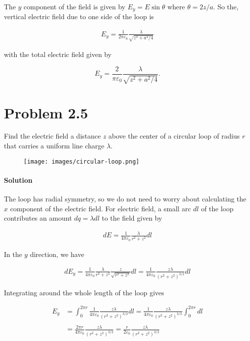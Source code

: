 \documentclass{article}
\begin{document}
The $y$ component of the field is given by $E_y = E\sin\theta$ where $\theta = 2z/a$. So the, vertical electric field due to one side of the loop is 

\begin{align*}
    E_y = \frac{1}{2\pi\varepsilon_0}{\frac{\lambda}{\sqrt{z^2  + a^2/4}}}
\end{align*}

with the total electric field given by 

$$
 E_y = \frac{2}{\pi\varepsilon_0}{\frac{\lambda}{\sqrt{z^2  + a^2/4}}}.
$$

\newpage

\section*{Problem 2.5}
Find the electric field a distance $z$ above the center of a circular loop of radius $r$ that carries a uniform line charge $\lambda$.

\begin{figure}[h]
    \centering
    \texttt{[image: images/circular-loop.png]}
\end{figure}

\paragraph{Solution} The loop has radial symmetry, so we do not need to worry about calculating the $x$ component of the electric field. For electric field, a small arc $dl$ of the loop contributes an amount $dq = \lambda dl$ to the field given by 

\begin{align*}
    dE = \frac{1}{4\pi\varepsilon_0}\frac{\lambda}{r^2 + z^2}dl
\end{align*}

In the $y$ direction, we have 

\begin{align*}
    dE_y = \frac{1}{4\pi\varepsilon_0}\frac{\lambda}{r^2 + z^2}\frac{z}{\sqrt{r^2 + z^2}}dl = \frac{1}{4\pi\varepsilon_0}\frac{z\lambda}{(r^2 + z^2)^{3/2}}dl
\end{align*}

Integrating around the whole length of the loop gives 

\begin{align*}
    E_y &= \int_{0}^{2\pi r}\frac{1}{4\pi\varepsilon_0}\frac{z\lambda}{(r^2 + z^2)^{3/2}}dl = \frac{1}{4\pi\varepsilon_0}\frac{z\lambda}{(r^2 + z^2)^{3/2}} \int_{0}^{2\pi r} dl \\ 
    \\
    &= \frac{2\pi r}{4\pi\varepsilon_0}\frac{z\lambda}{(r^2 + z^2)^{3/2}} = \frac{r}{2\varepsilon_0}\frac{z\lambda}{(r^2 + z^2)^{3/2}}
\end{align*}
\end{document}
